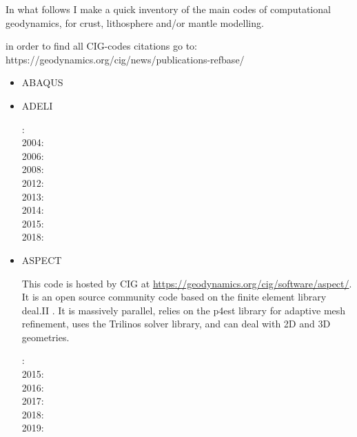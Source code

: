 
In what follows I make a quick inventory of the main codes of computational geodynamics, 
for crust, lithosphere and/or mantle modelling.

in order to find all CIG-codes citations go to: https://geodynamics.org/cig/news/publications-refbase/

\begin{itemize}

\item ABAQUS 

\cite{brry01}
\cite{gedh02}
\cite{fumr03}
\cite{camg07}
\cite{kuhe09}
\cite{makh09}
\cite{camg10}
\cite{nalr12}
\cite{pevp15}
\cite{naam17}
\cite{naam18}


\item ADELI 

: \cite{hajc97}\\
2004: \cite{gocl04}\\
2006: \cite{vech06} \\
2008: \cite{boht08a}\cite{boht08b}\\
2012: \cite{gech12}\cite{gigh12}\\
2013: \cite{wahd13}\\
2014: \cite{cehg14}\\
2015: \cite{ceag15}\\
2018: \cite{cegm18}\cite{gehn18}

\item ASPECT 

This code is hosted by CIG at \url{https://geodynamics.org/cig/software/aspect/}. 
It is an open source community code based on the finite element library deal.II \cite{arbc19}. 
It is massively parallel, relies on the p4est library for adaptive mesh refinement,
uses the Trilinos solver library, and can deal with 2D and 3D geometries. 

: \cite{krhb12}\\
2015: \cite{aupm15}\cite{tosn15}\\
2016: \cite{dahe16}\cite{gadb16}\cite{zhon16}\\
2017: \cite{hepb17}\cite{daef17}\cite{hedg17}\cite{robh17}\cite{robu17}\cite{aumh17}\cite{thie17}\cite{brsg17}
      \cite{onmz17}\cite{tasm17}\cite{zhli17}\\
2018: \cite{daga18}\cite{onzh18}\cite{gltf18}\cite{heps18}\cite{galh18}\cite{peka18}\cite{puth18}\cite{brst18b}\\
2019: \cite{baba19}\cite{stbl19}\cite{cocf19}\cite{liki19}\cite{galb19}\cite{dagg19}\cite{njas19}


\end{itemize}
